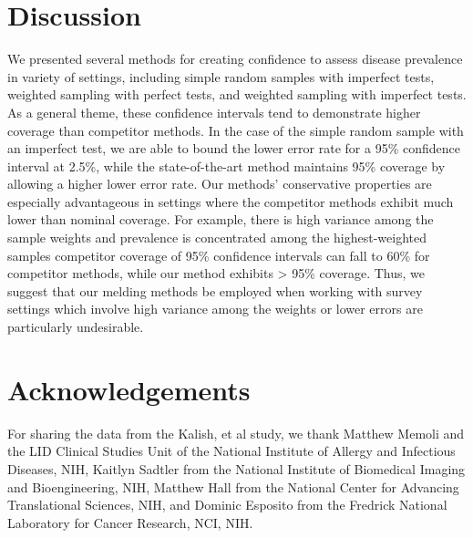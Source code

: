 \documentclass[AMA,STIX1COL]{WileyNJD-v2}
\begin{document}



\section{Discussion}

We presented several methods for creating confidence to assess disease prevalence in variety of settings, including simple random samples with imperfect tests, weighted sampling with perfect tests, and weighted sampling with imperfect tests.
As a general theme, these confidence intervals tend to demonstrate higher coverage than competitor methods.
In the case of the simple random sample with an imperfect test, we are able to bound the lower error rate for a 95\% confidence interval at 2.5\%, while the state-of-the-art method maintains 95\% coverage by allowing a higher lower error rate.
Our methods' conservative properties are especially advantageous in settings where the competitor methods exhibit much lower than nominal coverage.
For example, there is high variance among the sample weights and prevalence is concentrated among the highest-weighted samples competitor coverage of 95\% confidence intervals can fall to 60\% for competitor methods, while our method exhibits > 95\% coverage.
Thus, we suggest that our melding methods be employed when working with survey settings which involve high variance among the weights or lower errors are particularly undesirable.

\section{Acknowledgements}
For sharing the data from the Kalish, et al study, we thank Matthew Memoli and the LID Clinical Studies Unit of the National Institute of Allergy and Infectious Diseases, NIH,  Kaitlyn Sadtler from the National Institute of Biomedical Imaging and Bioengineering, NIH,   Matthew Hall from the National Center for Advancing Translational Sciences, NIH, and Dominic Esposito from the Fredrick National Laboratory for Cancer Research, NCI, NIH.
\end{document}
